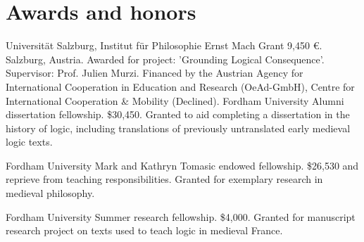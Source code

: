 \section{Awards and honors}
{%
	Universit\"at Salzburg, Institut f\"ur Philosophie}
{%
	Ernst Mach Grant}
{9,450 €. Salzburg, Austria. Awarded for project: 'Grounding Logical Consequence'. Supervisor: Prof. Julien Murzi. Financed by the Austrian Agency for International Cooperation in Education and Research (OeAd-GmbH), Centre for International Cooperation \& Mobility (Declined).}
{%
	Fordham  University}
{%
	Alumni dissertation fellowship.}
{\$30,450. Granted to aid completing a dissertation in the history of logic, including translations of previously untranslated early medieval logic texts.}

{Fordham University}
{
	Mark and Kathryn Tomasic endowed fellowship.}
{\$26,530 and reprieve from teaching responsibilities. Granted for exemplary research in medieval philosophy.}

{Fordham University}
{
	Summer research fellowship.}
{\$4,000. Granted for manuscript research project on texts used to teach logic in medieval France.}
